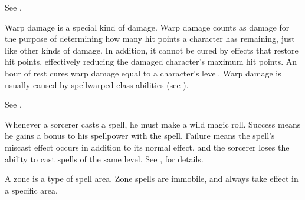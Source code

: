  See .

 Warp damage is a special kind of damage.
Warp damage counts as damage for the purpose of determining how many hit points a character has remaining, just like other kinds of damage.
In addition, it cannot be cured by effects that restore hit points, effectively reducing the damaged character's maximum hit points.
An hour of rest cures warp damage equal to a character's level.
Warp damage is usually caused by spellwarped class abilities (see ).

 See .

 Whenever a sorcerer casts a spell, he must make a wild magic roll.
Success means he gains a bonus to his spellpower with the spell.
Failure means the spell's miscast effect occurs in addition to its normal effect, and the sorcerer loses the ability to cast spells of the same level.
See , for details.

 A zone is a type of spell area.
Zone spells are immobile, and always take effect in a specific area.
